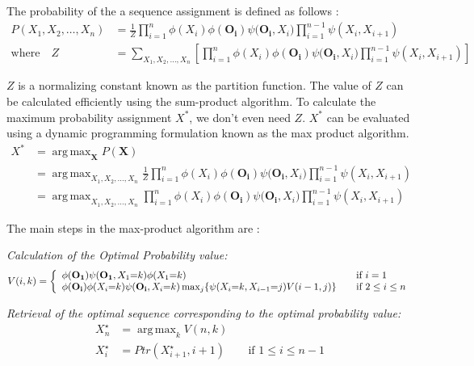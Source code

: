 \documentclass{article}
\DeclareMathOperator*{\argmax}{arg\,max}
\begin{document}
\pagebreak

The probability of the a sequence assignment is defined as follows :
\begin{align*}
P(X_1,X_2,\dotsc,X_n) &= \frac{1}{Z}\prod_{i=1}^{n}{\phi(X_i)\phi(\mathbf{O_i})\psi(\mathbf{O_i},X_i})\prod_{i=1}^{n-1}{\psi(X_i,X_{i+1})} \\
\text{where} \quad Z &= \sum_{X_1,X_2,\dotsc,X_n}\left[{\prod_{i=1}^{n}{\phi(X_i)\phi(\mathbf{O_i})\psi(\mathbf{O_i},X_i})\prod_{i=1}^{n-1}{\psi(X_i,X_{i+1})}}\right]
\end{align*}


$Z$ is a normalizing constant known as the partition function. The value of $Z$ can be calculated efficiently using the sum-product algorithm. To calculate the maximum probability assignment $X^*$, we don't even need $Z$. $X^*$ can be evaluated using a dynamic programming formulation known as the max product algorithm. 
\begin{align*}
X^* &= \argmax_{\mathbf{X}}P(\mathbf{X})\\
 &= \argmax_{X_1,X_2,\dotsc,X_n}\frac{1}{Z}\prod_{i=1}^{n}{\phi(X_i)\phi(\mathbf{O_i})\psi(\mathbf{O_i},X_i})\prod_{i=1}^{n-1}{\psi(X_i,X_{i+1})} \\
 &= \argmax_{X_1,X_2,\dotsc,X_n}\prod_{i=1}^{n}{\phi(X_i)\phi(\mathbf{O_i})\psi(\mathbf{O_i},X_i})\prod_{i=1}^{n-1}{\psi(X_i,X_{i+1})}
\end{align*}

 The main steps in the max-product algorithm are : 

\vspace*{0.2in}

\textit{Calculation of the Optimal Probability value:}
\[
  V(i,k) = \left\{
  \begin{array}{l l}
    \phi(\mathbf{O_1})\psi(\mathbf{O_1},X_1{=}k)\phi(X_1{=}k) & \quad \text{if $i=1$}\\
    \phi(\mathbf{O_i})\phi(X_i{=}k)\psi(\mathbf{O_i},X_i{=}k)\max_{j}\{\psi(X_{i}{=}k,X_{i-1}{=}j)V(i-1,j)\} & \quad \text{if $2\leq i\leq n$}\\
  \end{array} \right.
\]


\textit{Retrieval of the optimal sequence corresponding to the optimal probability value:}
\begin{align*}
X^\star_n &= \argmax_{k}V(n,k) \\
X^\star_{i} &= Ptr(X^\star_{i+1},i+1) & \quad \text{if $1\leq i \leq n-1 $}
\end{align*}
\end{document}
